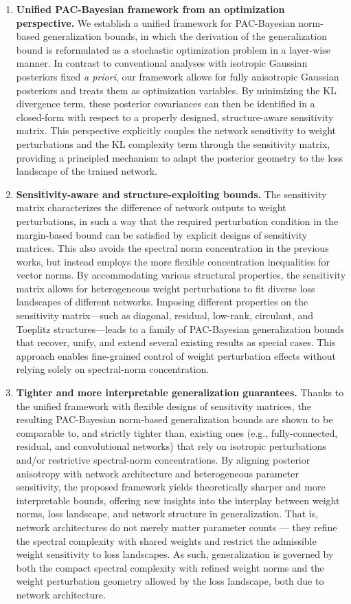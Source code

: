 \documentclass[journal]{IEEEtran} %
\begin{document}
\begin{enumerate}
    \item \textbf{Unified PAC-Bayesian framework from an optimization perspective.} We establish a unified framework for PAC-Bayesian norm-based generalization bounds, in which the derivation of the generalization bound is reformulated as a stochastic optimization problem in a layer-wise manner. In contrast to conventional analyses with isotropic Gaussian posteriors fixed \textit{a priori}, our framework allows for fully anisotropic Gaussian posteriors and treats them as optimization variables. By minimizing the KL divergence term, these posterior covariances can then be identified in a closed-form with respect to a properly designed, structure-aware sensitivity matrix. This perspective explicitly couples the network sensitivity to weight perturbations and the KL complexity term through the sensitivity matrix, providing a principled mechanism to adapt the posterior geometry to the loss landscape of the trained network.
    \item \textbf{Sensitivity-aware and structure-exploiting bounds.} The sensitivity matrix characterizes the difference of network outputs to weight perturbations, in such a way that the required perturbation condition in the margin-based bound can be satisfied by explicit designs of sensitivity matrices. This also avoids the spectral norm concentration in the previous works, but instead employs the more flexible concentration inequalities for vector norms. By accommodating various structural properties, the sensitivity matrix allows for heterogeneous weight perturbations to fit diverse loss landscapes of different networks. Imposing different properties on the sensitivity matrix—such as diagonal, residual, low-rank, circulant, and Toeplitz structures—leads to a family of PAC-Bayesian generalization bounds that recover, unify, and extend several existing results as special cases. This approach enables fine-grained control of weight perturbation effects without relying solely on spectral-norm concentration.
    \item \textbf{Tighter and more interpretable generalization guarantees.} Thanks to the unified framework with flexible designs of sensitivity matrices, the resulting PAC-Bayesian norm-based generalization bounds are shown to be comparable to, and strictly tighter than, existing ones (e.g., fully-connected, residual, and convolutional networks) that rely on isotropic perturbations and/or restrictive spectral-norm concentrations. By aligning posterior anisotropy with network architecture and heterogeneous parameter sensitivity, the proposed framework yields theoretically sharper and more interpretable bounds, offering new insights into the interplay between weight norms, loss landscape, and network structure in generalization. That is, network architectures do not merely matter parameter counts --- they refine the spectral complexity with shared weights and restrict the admissible weight sensitivity to loss landscapes. As such, generalization is governed by both the compact spectral complexity with refined weight norms and the weight perturbation geometry allowed by the loss landscape, both due to network architecture.
\end{enumerate}
\end{document}
